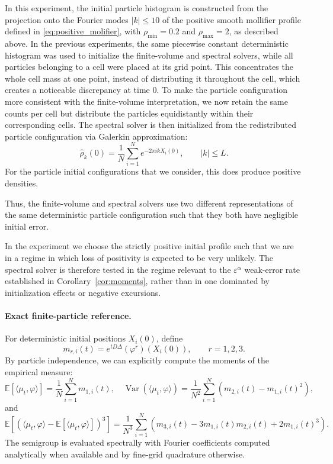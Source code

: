 \documentclass[a4paper,12pt]{article}
\newcommand{\E}{\mathbb{E}}
\begin{document}
 In this experiment, the initial particle histogram is constructed from the projection onto the Fourier modes
$|k|\leq10$ of the positive smooth mollifier profile defined in
\eqref{eq:positive_molifier}, with $\rho_{\min}=0.2$ and
$\rho_{\max}=2$, as described above. In the previous experiments, the same piecewise constant deterministic histogram was used to initialize the finite-volume and spectral solvers, while all particles belonging to a cell were placed at its grid point. This concentrates the whole cell mass at one point, instead of distributing it throughout the cell, which creates a noticeable discrepancy at time \(0\). To make the particle configuration more consistent with the finite-volume interpretation, we now retain the same counts per cell but distribute the particles equidistantly within their corresponding cells. 
The spectral solver is then initialized from the redistributed particle configuration via Galerkin approximation: 
\[ \widehat{\rho}_k(0) = \frac1{N} \sum_{i=1}^{N} e^{-2\pi ikX_i(0)}, \qquad |k|\leq L. \]
For the particle initial configurations that we consider, this does produce positive densities.

Thus, the finite-volume and spectral solvers use two different representations
of the same deterministic particle configuration such that they both have negligible initial error.


In the experiment we choose the strictly positive initial profile such that we are in a regime
in which loss of positivity is expected to be very unlikely. The spectral
solver is therefore tested in the regime relevant to the
$\varepsilon^\alpha$ weak-error rate established in
Corollary~\ref{cor:moments}, rather than in one dominated by initialization
effects or negative excursions.

\paragraph{Exact finite-particle reference.}

For deterministic initial positions $X_i(0)$, define 
\[
    m_{r,i}(t) = e^{tD\Delta}(\varphi^r)(X_i(0)),\qquad r=1,2,3.
\]
By particle independence, we can explicitly compute the moments of the empirical measure: 
\[
\mathbb E[\langle \mu_t, \varphi\rangle]
=\frac{1}{N}\sum_{i=1}^{N}m_{1,i}(t),\quad 
\operatorname{Var}(\langle \mu_t, \varphi\rangle)
=\frac{1}{N^2}\sum_{i=1}^{N}
\left(m_{2,i}(t)-m_{1,i}(t)^2\right),
\]
and
\[
\E[(\langle \mu_t,\varphi\rangle - \E[\langle \mu_t, \varphi\rangle])^3]
=\frac{1}{N^3}\sum_{i=1}^{N}
\left(m_{3,i}(t)-3m_{1,i}(t)m_{2,i}(t)+2m_{1,i}(t)^3\right).
\]
The semigroup is evaluated spectrally 
with Fourier coefficients computed analytically when available and by fine-grid quadrature otherwise. 
\end{document}
